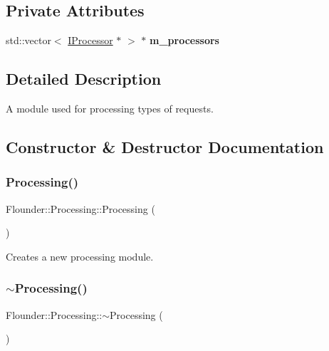 \subsection*{Private Attributes}
\begin{DoxyCompactItemize}
\item 
\mbox{\label{class_flounder_1_1_processing_aabf75ea7889093b9b9b650a2221c4ad7}} 
std\+::vector$<$ \hyperlink{class_flounder_1_1_i_processor}{I\+Processor} $\ast$ $>$ $\ast$ {\bfseries m\+\_\+processors}
\end{DoxyCompactItemize}


\subsection{Detailed Description}
A module used for processing types of requests. 



\subsection{Constructor \& Destructor Documentation}
\mbox{\label{class_flounder_1_1_processing_a3c38ca4fb85af3bf5b0b639a2705fb4d}} 
\subsubsection{\texorpdfstring{Processing()}{Processing()}}
{\footnotesize\ttfamily Flounder\+::\+Processing\+::\+Processing (\begin{DoxyParamCaption}{ }\end{DoxyParamCaption})}



Creates a new processing module. 

\mbox{\label{class_flounder_1_1_processing_a1abc720f74c9c06e5396bfcd66528f79}} 
\subsubsection{\texorpdfstring{$\sim$\+Processing()}{~Processing()}}
{\footnotesize\ttfamily Flounder\+::\+Processing\+::$\sim$\+Processing (\begin{DoxyParamCaption}{ }\end{DoxyParamCaption})}



